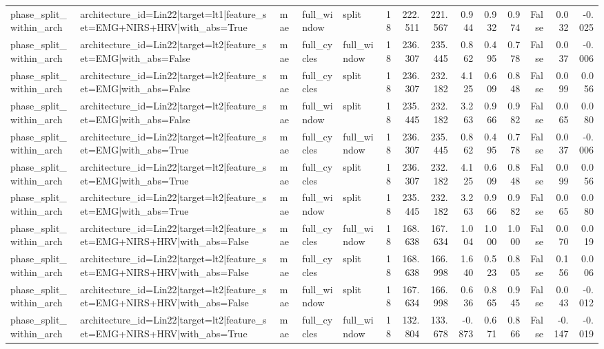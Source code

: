 \begin{table}
\begin{tabular}{lllllrrrrrrrrr}
phase_split_within_arch & architecture_id=Lin22|target=lt1|feature_set=EMG+NIRS+HRV|with_abs=True & mae & full_window & split & 18 & 222.511 & 221.567 & 0.944 & 0.932 & 0.974 & False & 0.032 & -0.025 \\
phase_split_within_arch & architecture_id=Lin22|target=lt2|feature_set=EMG|with_abs=False & mae & full_cycles & full_window & 18 & 236.307 & 235.445 & 0.862 & 0.495 & 0.778 & False & 0.037 & -0.006 \\
phase_split_within_arch & architecture_id=Lin22|target=lt2|feature_set=EMG|with_abs=False & mae & full_cycles & split & 18 & 236.307 & 232.182 & 4.125 & 0.609 & 0.848 & False & 0.099 & 0.056 \\
phase_split_within_arch & architecture_id=Lin22|target=lt2|feature_set=EMG|with_abs=False & mae & full_window & split & 18 & 235.445 & 232.182 & 3.263 & 0.966 & 0.982 & False & 0.065 & 0.080 \\
phase_split_within_arch & architecture_id=Lin22|target=lt2|feature_set=EMG|with_abs=True & mae & full_cycles & full_window & 18 & 236.307 & 235.445 & 0.862 & 0.495 & 0.778 & False & 0.037 & -0.006 \\
phase_split_within_arch & architecture_id=Lin22|target=lt2|feature_set=EMG|with_abs=True & mae & full_cycles & split & 18 & 236.307 & 232.182 & 4.125 & 0.609 & 0.848 & False & 0.099 & 0.056 \\
phase_split_within_arch & architecture_id=Lin22|target=lt2|feature_set=EMG|with_abs=True & mae & full_window & split & 18 & 235.445 & 232.182 & 3.263 & 0.966 & 0.982 & False & 0.065 & 0.080 \\
phase_split_within_arch & architecture_id=Lin22|target=lt2|feature_set=EMG+NIRS+HRV|with_abs=False & mae & full_cycles & full_window & 18 & 168.638 & 167.634 & 1.004 & 1.000 & 1.000 & False & 0.070 & 0.019 \\
phase_split_within_arch & architecture_id=Lin22|target=lt2|feature_set=EMG+NIRS+HRV|with_abs=False & mae & full_cycles & split & 18 & 168.638 & 166.998 & 1.640 & 0.523 & 0.805 & False & 0.156 & 0.006 \\
phase_split_within_arch & architecture_id=Lin22|target=lt2|feature_set=EMG+NIRS+HRV|with_abs=False & mae & full_window & split & 18 & 167.634 & 166.998 & 0.636 & 0.865 & 0.945 & False & 0.043 & -0.012 \\
phase_split_within_arch & architecture_id=Lin22|target=lt2|feature_set=EMG+NIRS+HRV|with_abs=True & mae & full_cycles & full_window & 18 & 132.804 & 133.678 & -0.873 & 0.671 & 0.866 & False & -0.147 & -0.019 \\

\end{tabular}
\end{table}
